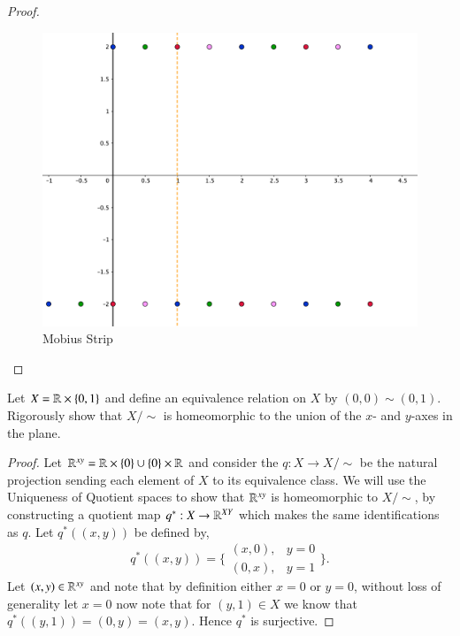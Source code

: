 \documentclass[minion]{homework651}
\begin{document}
\begin{problems}
\begin{subproblems}
\begin{proof}
        \begin{figure}[H]
          \begin{center}
            \caption{Mobius Strip}
            \includegraphics[width=.76\textwidth]{MOBIUS.png}
          \end{center}
        \end{figure}

        
    \end{proof}
    \end{subproblems}
    
    
    \problem
    Let $X=\mathbb R\times\{0,1\}$ and define an equivalence
    relation on $X$ by $(0,0)\sim(0,1)$.  Rigorously show that $X/\sim$
    is homeomorphic to the union of the $x$- and $y$-axes in the plane.
    \begin{proof} 
        Let $\mathbb R^{xy} = \mathbb R\times \{0\} \cup \{0\}\times\mathbb R$ and consider the $q: X \to X/\sim$ be the natural projection sending each element of $X$ to its equivalence class. We will use the Uniqueness of Quotient
        spaces to show that $\mathbb R^{xy}$ is homeomorphic to $X/\sim$, by constructing a quotient map $q^*: X \to \mathbb R^{XY}$ which makes the same identifications as $q$.
        Let $q^*((x, y))$ be defined by, 
        \begin{equation*}
            q^*((x, y)) = \biggl\{\begin{array}{cc}
                (x, 0), & y = 0\\
                (0, x), & y = 1
              \end{array}\biggr\}.
        \end{equation*}
        Let $(x, y) \in \mathbb R^{xy}$ and note that by definition either $x = 0$ or $y = 0$, without loss of generality let $x = 0$ now note that 
        for $(y, 1) \in X$ we know that $q^*((y, 1)) = (0, y) = (x, y)$. Hence $q^*$ is surjective. 


\end{proof}
\end{problems}
\end{document}
